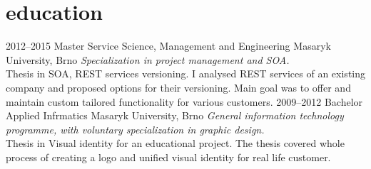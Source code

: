 \documentclass[]{friggeri-cv} %
\begin{document}

\section{education}

\begin{entrylist}
\entry
{2012--2015}
{Master {\normalfont Service Science, Management and Engineering}}
{Masaryk University, Brno}
{\emph{Specialization in project management and SOA.} \\ Thesis in SOA, REST services versioning. I analysed REST services of an existing company and proposed options for their versioning. Main goal was to offer and maintain custom tailored functionality for various customers.}
\entry
{2009--2012}
{Bachelor {\normalfont Applied Infrmatics}}
{Masaryk University, Brno}
{\emph{General information technology programme, with voluntary specialization in graphic design.} \\ Thesis in Visual identity for an educational project. The thesis covered whole process of creating a logo and unified visual identity for real life customer.}
\end{entrylist}



\end{document}
